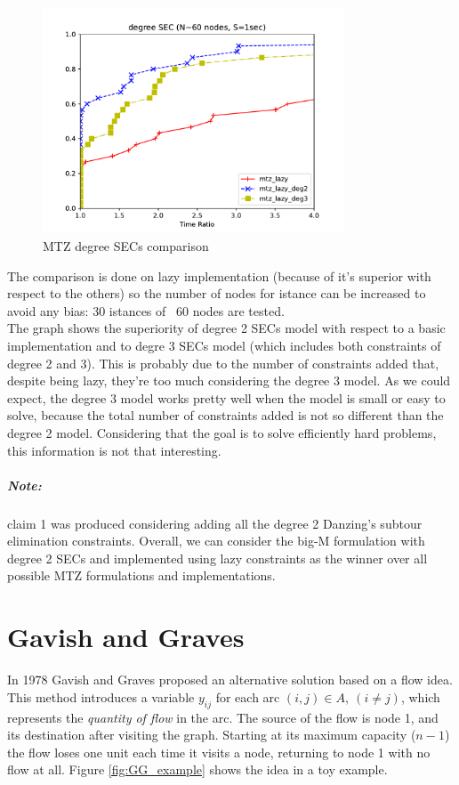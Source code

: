 \begin{figure}[h]
    \centering
    \includegraphics[width=0.8\textwidth]{figures/mtz_comp2.pdf}
    \caption{MTZ degree SECs comparison}
\end{figure}

The comparison is done on lazy implementation (because of it's superior with
respect to the others) so the number of nodes for istance can be increased to
avoid any bias: 30 istances of ~60 nodes are tested.\\

The graph shows the superiority of degree 2 SECs model with respect to a basic
implementation and to degre 3 SECs model (which includes both constraints of
degree 2 and 3). This is probably due to the number of constraints added that,
despite being lazy, they're too much considering the degree 3 model. As
we could expect, the degree 3 model works pretty well when the model is small
or easy to solve, because the total number of constraints added is not so
different than the degree 2 model. Considering that the goal is to solve
efficiently hard problems, this information is not that interesting.

\subparagraph{Note:} claim 1 was produced considering adding all the degree
2 Danzing's subtour elimination constraints. Overall, we can consider the big-M
formulation with degree 2 SECs and implemented using lazy constraints as the
winner over all possible MTZ formulations and implementations.




\section{Gavish and Graves}
In 1978 Gavish and Graves \citep{gavish1978travelling}\citep{orman2006survey}
proposed an alternative solution based on a flow idea. This method introduces a
variable $y_{ij}$ for each arc $(i,j) \in A,\ (i\neq j)$, which represents the
\emph{quantity of flow} in the arc. The source of the flow is node 1, and its
destination after visiting the graph. Starting at its maximum capacity ($n -
1$) the flow loses one unit each time it visits a node, returning to node 1
with no flow at all. Figure \ref{fig:GG_example} shows the idea in a toy
example.


